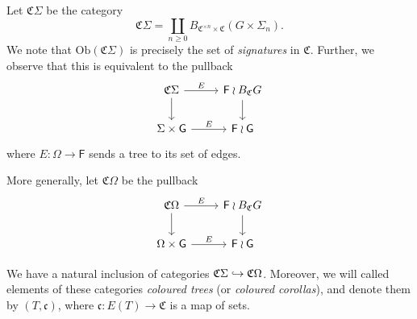 \documentclass[a4paper,10pt
,draft
]{article}%
\begin{document}
\begin{definition}
      Let $\mathfrak C \Sigma$ be the category
      \begin{equation}
            \mathfrak C \Sigma = \coprod\limits_{n\geq 0} B_{\mathfrak C^{\times n} \times \mathfrak C}(G \times \Sigma_n).
      \end{equation}
      We note that $\mathrm{Ob}(\mathfrak C \Sigma)$ is precisely the set of \textit{signatures} in $\mathfrak C$.
      Further, we observe that this is equivalent to the pullback
      \begin{equation}
            \label{CSIGMA_EQ}
            \begin{tikzcd}
                  \mathfrak C \Sigma \arrow[d] \arrow[r, "E"]
                  &
                  \mathsf F \wr B_{\mathfrak C}G \arrow[d]
                  \\
                  \Sigma \times \mathsf G \arrow[r, "E"]
                  &
                  \mathsf F \wr \mathsf G
            \end{tikzcd}
      \end{equation}
      where $E: \Omega \to \mathsf F$ sends a tree to its set of edges.
      
      More generally, let $\mathfrak C \Omega$ be the pullback
      \begin{equation}
            \label{COMEGA_EQ}
            \begin{tikzcd}
                  \mathfrak C \Omega \arrow[d] \arrow[r, "E"]
                  &
                  \mathsf F \wr B_{\mathfrak C}G \arrow[d]
                  \\
                  \Omega \times \mathsf G \arrow[r, "E"]
                  &
                  \mathsf F \wr \mathsf G
            \end{tikzcd}
      \end{equation}

      We have a natural inclusion of categories $\mathfrak C \Sigma \hookrightarrow \mathfrak C \Omega$.
      Moreover, we will called elements of these categories
      \textit{coloured trees} (or \textit{coloured corollas}),
      and denote them by $(T,\mathfrak c)$, where $\mathfrak c: E(T) \to \mathfrak C$ is a map of sets.
\end{definition}
\end{document}
